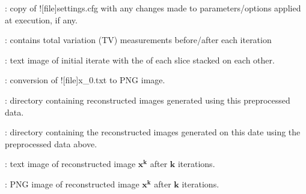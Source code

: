 \begin{tcbenvironment}
\begin{tcbparagraph}
\begin{ThinEnum}
\begin{ThinEnum}
\begin{ThinEnum}
\begin{ThinEnum}
\begin{ThinEnum}
\begin{ThinEnum}
\begin{ThinEnum}
\begin{ThinEnum}
\begin{ThinEnum}
\newpage
							\item {} : copy of \docentry![file]{settings.cfg} with any changes made to parameters/options applied at execution, if any.
                                        	\item {} : contains total variation (TV) measurements before/after each iteration
                                        	\item {} : text image of initial iterate with the \xyplane* of each slice stacked on each other.
                                        \item {} : conversion of \docentry![file]{x\_0.txt} to PNG image.
                                        \item {} : directory containing reconstructed images generated using this preprocessed data.
                                        \begin{ThinEnum}
                                            \item {} : directory containing the reconstructed images generated on this date using the preprocessed data above.
                                                \begin{ThinEnum}
                                                    \item {} : text image of reconstructed image $\boldsymbol{x^k}$ after $\boldsymbol{k}$ iterations.
                                                    \item {} : PNG image of reconstructed image $\boldsymbol{x^k}$ after $\boldsymbol{k}$ iterations.
                                                \end{ThinEnum}
                                        \end{ThinEnum}
                                    \end{ThinEnum}
                                \end{ThinEnum}

\end{ThinEnum}
\end{ThinEnum}
\end{ThinEnum}
\end{ThinEnum}
\end{ThinEnum}
\end{ThinEnum}
\end{ThinEnum}
\end{tcbparagraph}
\end{tcbenvironment}

